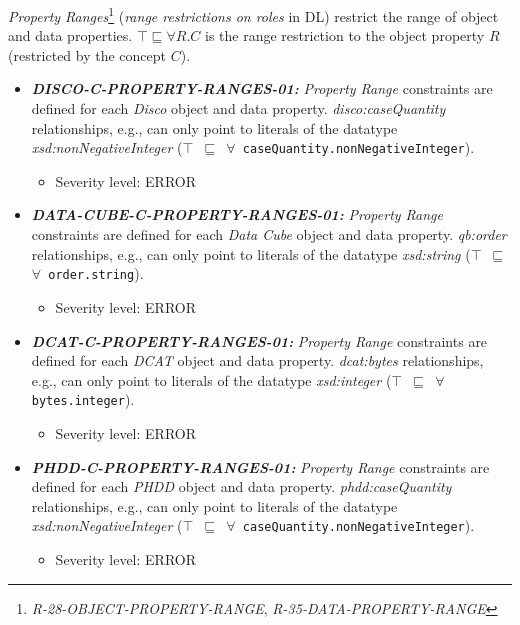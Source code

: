 \documentclass{llncs}
\newcommand{\ms}[1]{\texttt{#1}}
\begin{document}
{\em Property Ranges}\footnote{{\em R-28-OBJECT-PROPERTY-RANGE}, {\em R-35-DATA-PROPERTY-RANGE}} ({\em range restrictions on roles} in DL) restrict the range of object and data properties.
$\top \sqsubseteq \forall R . C$ is the range restriction to the object property $R$ (restricted by the concept $C$). 

\begin{itemize}
	\item \textbf{{\em DISCO-C-PROPERTY-RANGES-01:}} 
	{\em Property Range} constraints are defined for each \emph{Disco} object and data property.
  {\em disco:caseQuantity} relationships, e.g., can only point to literals of the datatype {\em xsd:nonNegativeInteger} (\ms{$\top$ $\sqsubseteq$ $\forall$ caseQuantity.nonNegativeInteger}).
	\begin{itemize}
		\item Severity level: ERROR
	\end{itemize}
\end{itemize}

\begin{itemize}
	\item \textbf{{\em DATA-CUBE-C-PROPERTY-RANGES-01:}} 
	{\em Property Range} constraints are defined for each \emph{Data Cube} object and data property.
  {\em qb:order} relationships, e.g., can only point to literals of the datatype {\em xsd:string} (\ms{$\top$ $\sqsubseteq$ $\forall$ order.string}).
	\begin{itemize}
		\item Severity level: ERROR
	\end{itemize}
\end{itemize}

\begin{itemize}
	\item \textbf{{\em DCAT-C-PROPERTY-RANGES-01:}} 
	{\em Property Range} constraints are defined for each \emph{DCAT} object and data property.
  {\em dcat:bytes} relationships, e.g., can only point to literals of the datatype {\em xsd:integer} (\ms{$\top$ $\sqsubseteq$ $\forall$ bytes.integer}).
	\begin{itemize}
		\item Severity level: ERROR
	\end{itemize}
\end{itemize}

\begin{itemize}
	\item \textbf{{\em PHDD-C-PROPERTY-RANGES-01:}} 
	{\em Property Range} constraints are defined for each \emph{PHDD} object and data property.
  {\em phdd:caseQuantity} relationships, e.g., can only point to literals of the datatype {\em xsd:nonNegativeInteger} (\ms{$\top$ $\sqsubseteq$ $\forall$ caseQuantity.nonNegativeInteger}).
	\begin{itemize}
		\item Severity level: ERROR
	\end{itemize}
\end{itemize}
\end{document}
